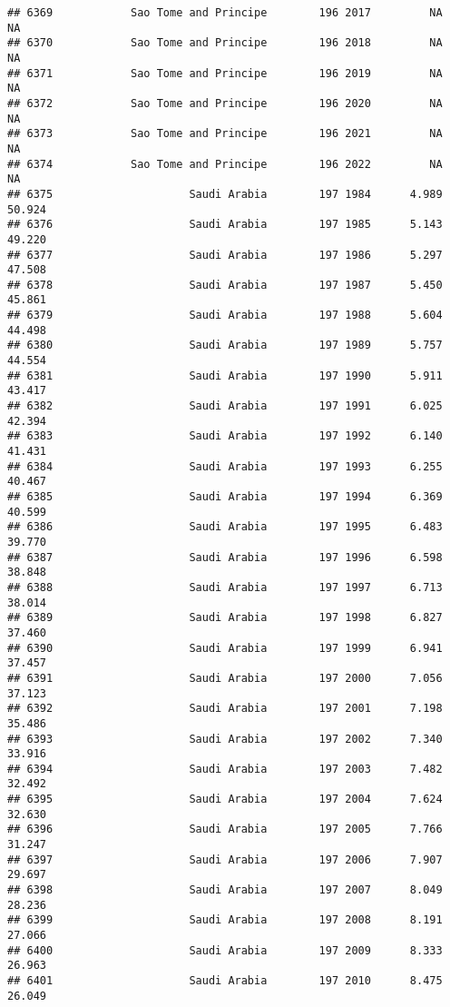 \documentclass[
]{article}
\begin{document}
\begin{verbatim}
## 6369            Sao Tome and Principe        196 2017         NA         NA
## 6370            Sao Tome and Principe        196 2018         NA         NA
## 6371            Sao Tome and Principe        196 2019         NA         NA
## 6372            Sao Tome and Principe        196 2020         NA         NA
## 6373            Sao Tome and Principe        196 2021         NA         NA
## 6374            Sao Tome and Principe        196 2022         NA         NA
## 6375                     Saudi Arabia        197 1984      4.989     50.924
## 6376                     Saudi Arabia        197 1985      5.143     49.220
## 6377                     Saudi Arabia        197 1986      5.297     47.508
## 6378                     Saudi Arabia        197 1987      5.450     45.861
## 6379                     Saudi Arabia        197 1988      5.604     44.498
## 6380                     Saudi Arabia        197 1989      5.757     44.554
## 6381                     Saudi Arabia        197 1990      5.911     43.417
## 6382                     Saudi Arabia        197 1991      6.025     42.394
## 6383                     Saudi Arabia        197 1992      6.140     41.431
## 6384                     Saudi Arabia        197 1993      6.255     40.467
## 6385                     Saudi Arabia        197 1994      6.369     40.599
## 6386                     Saudi Arabia        197 1995      6.483     39.770
## 6387                     Saudi Arabia        197 1996      6.598     38.848
## 6388                     Saudi Arabia        197 1997      6.713     38.014
## 6389                     Saudi Arabia        197 1998      6.827     37.460
## 6390                     Saudi Arabia        197 1999      6.941     37.457
## 6391                     Saudi Arabia        197 2000      7.056     37.123
## 6392                     Saudi Arabia        197 2001      7.198     35.486
## 6393                     Saudi Arabia        197 2002      7.340     33.916
## 6394                     Saudi Arabia        197 2003      7.482     32.492
## 6395                     Saudi Arabia        197 2004      7.624     32.630
## 6396                     Saudi Arabia        197 2005      7.766     31.247
## 6397                     Saudi Arabia        197 2006      7.907     29.697
## 6398                     Saudi Arabia        197 2007      8.049     28.236
## 6399                     Saudi Arabia        197 2008      8.191     27.066
## 6400                     Saudi Arabia        197 2009      8.333     26.963
## 6401                     Saudi Arabia        197 2010      8.475     26.049

\end{verbatim}
\end{document}

